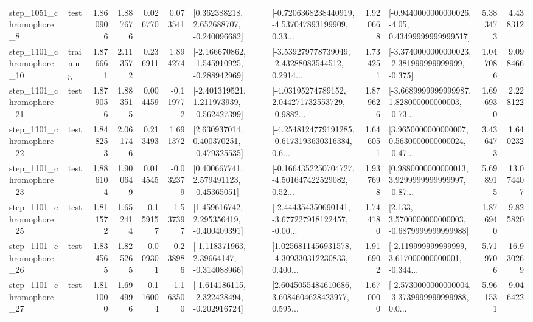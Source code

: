\begin{tabular}{llrrrrllrlrr}
  step\_1051\_chromophore\_8 &      test &      1.860906 &    1.887676 &      0.026770 &  0.073541 &    [0.362388218, 2.652688707, -0.240096682] &  [-0.7206368238440919, -4.537047893199909, 0.33... &       1.920668 &  [-0.9440000000000026, -4.05, 0.43499999999999517] &            5.383473 &          4.438312 \\
 step\_1101\_chromophore\_10 &  training &      1.876661 &    2.113572 &      0.236911 &  1.894274 &  [-2.166670862, -1.545910925, -0.288942969] &  [-3.539279778739049, -2.43288083544512, 0.2914... &       1.734251 &  [-3.3740000000000023, -2.381999999999999, -0.375] &            1.047086 &          9.098466 \\
 step\_1101\_chromophore\_21 &      test &      1.879056 &    1.883515 &      0.004459 & -0.119772 &   [-2.401319521, 1.211973939, -0.562427399] &  [-4.03195274789152, 2.044271732553729, -0.9882... &       1.879626 &  [-3.6689999999999987, 1.828000000000003, -0.73... &            1.696930 &          2.228122 \\
 step\_1101\_chromophore\_22 &      test &      1.848253 &    2.061746 &      0.213493 &  1.691372 &    [2.630937014, 0.400370251, -0.479325535] &  [-4.2548124779191285, -0.6173193630316384, 0.6... &       1.646051 &  [3.9650000000000007, 0.5630000000000024, -0.47... &            3.436473 &          1.640232 \\
 step\_1101\_chromophore\_23 &      test &      1.886104 &    1.900649 &      0.014545 & -0.032379 &     [0.400667741, 2.579491123, -0.45365051] &  [-0.1664352250704727, -4.501647422529082, 0.52... &       1.937698 &  [0.9880000000000013, 3.9299999999999997, -0.87... &            5.698915 &         13.074407 \\
 step\_1101\_chromophore\_25 &      test &      1.811572 &    1.652414 &     -0.159157 & -1.537397 &    [1.459616742, 2.295356419, -0.400409391] &  [-2.444354350690141, -3.677227918122457, -0.00... &       1.744180 &   [2.133, 3.5700000000000003, -0.6879999999999988] &            1.876940 &          9.825820 \\
 step\_1101\_chromophore\_26 &      test &      1.834565 &    1.825265 &     -0.009301 & -0.238986 &    [-1.118371963, 2.39664147, -0.314088966] &  [1.0256811456931578, -4.309330312230833, 0.400... &       1.916902 &  [-2.119999999999999, 3.617000000000001, -0.344... &            5.719706 &         16.930269 \\
 step\_1101\_chromophore\_27 &      test &      1.811000 &    1.694996 &     -0.116004 & -1.163500 &  [-1.614186115, -2.322428494, -0.202916724] &  [2.6045055484610686, 3.6084604628423977, 0.595... &       1.670000 &  [-2.5730000000000004, -3.3739999999999988, 0.0... &            5.961531 &          9.046422 \\

\end{tabular}
